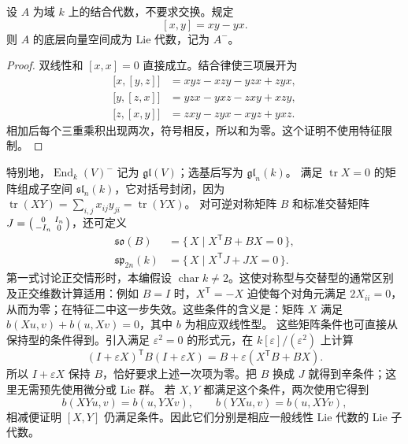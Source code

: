 \begin{proposition}\label{b5:prop:commutator-lie-algebra}
	设 \(A\) 为域 \(k\) 上的结合代数，不要求交换。规定
	\[
		[x,y]=xy-yx.
	\]
	则 \(A\) 的底层向量空间成为 Lie 代数，记为 \(A^{-}\)。
\end{proposition}
\begin{proof}
	双线性和 \([x,x]=0\) 直接成立。结合律使三项展开为
	\[
		\begin{aligned}
			\bigl[x,[y,z]\bigr]&=xyz-xzy-yzx+zyx,\\
			\bigl[y,[z,x]\bigr]&=yzx-yxz-zxy+xzy,\\
			\bigl[z,[x,y]\bigr]&=zxy-zyx-xyz+yxz.
		\end{aligned}
	\]
	相加后每个三重乘积出现两次，符号相反，所以和为零。这个证明不使用特征限制。
\end{proof}
特别地，\(\operatorname{End}_k(V)^{-}\) 记为 \(\mathfrak{gl}(V)\)；选基后写为 \(\mathfrak{gl}_n(k)\)。 满足 \(\operatorname{tr}X=0\) 的矩阵组成子空间 \(\mathfrak{sl}_n(k)\)，它对括号封闭，因为 \(\operatorname{tr}(XY)=\sum_{i,j}x_{ij}y_{ji}=\operatorname{tr}(YX)\)。
\ProseParagraphBreak
对可逆对称矩阵 \(B\) 和标准交替矩阵
\(J=\begin{psmallmatrix}0&I_n\\-I_n&0\end{psmallmatrix}\)，还可定义
\[
	\begin{aligned}
		\mathfrak{so}(B)&=\{\,X\mid X^{\mathsf T}B+BX=0\,\},\\
		\mathfrak{sp}_{2n}(k)&=\{\,X\mid X^{\mathsf T}J+JX=0\,\}.
	\end{aligned}
\]
第一式讨论正交情形时，本编假设 \(\operatorname{char}k\ne2\)。这使对称型与交替型的通常区别及正交维数计算适用：例如 \(B=I\) 时，\(X^{\mathsf T}=-X\) 迫使每个对角元满足 \(2X_{ii}=0\)，从而为零；在特征二中这一步失效。这些条件的含义是：矩阵 \(X\) 满足 \(b(Xu,v)+b(u,Xv)=0\)，其中 \(b\) 为相应双线性型。 这些矩阵条件也可直接从保持型的条件得到。引入满足 \(\varepsilon^2=0\) 的形式元，在 \(k[\varepsilon]/(\varepsilon^2)\) 上计算
\[
	(I+\varepsilon X)^{\mathsf T}B(I+\varepsilon X) =B+\varepsilon(X^{\mathsf T}B+BX).
\]
所以 \(I+\varepsilon X\) 保持 \(B\)，恰好要求上述一次项为零。把 \(B\) 换成 \(J\) 就得到辛条件；这里无需预先使用微分或 Lie 群。 若 \(X,Y\) 都满足这个条件，两次使用它得到
\[
	b(XYu,v)=b(u,YXv),\qquad b(YXu,v)=b(u,XYv),
\]
相减便证明 \([X,Y]\) 仍满足条件。因此它们分别是相应一般线性 Lie 代数的 Lie 子代数。
